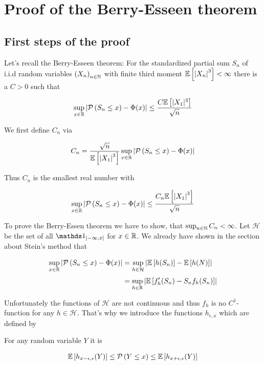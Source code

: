 \section{Proof of the Berry-Esseen theorem}

\subsection{First steps of the proof}

Let's recall the Berry-Esseen theorem: For the standardized partial sum $S_n$ of i.i.d random variables $\left({X_n}\right)_{{n}\in\mathbb N}$ with finite third moment $\mathbb E\left[{\left|{X_n}\right|^3}\right]<\infty$ there is a $C > 0$ such that

\begin{align}
  \sup_{x\in\mathbb R} \left|{\mathcal P\left({S_n\le x}\right)-\Phi(x)}\right| \le \frac{C \mathbb E\left[{|X_1|^3}\right]}{\sqrt n}
\end{align}

We first define $C_n$ via

\begin{align}
  C_n = \frac{\sqrt{n}}{\mathbb E\left[{\left|{X_1}\right|^3}\right]} \sup_{x\in\mathbb R} \left|{\mathcal P\left({S_n \le x}\right)-\Phi(x)}\right|
\end{align}

\noindent Thus $C_n$ is the smallest real number with

\begin{align}
  \sup_{x\in\mathbb R}\left|{\mathcal P\left({S_n\le x}\right) - \Phi(x)}\right| \le \frac{C_n\mathbb E\left[{\left|{X_1}\right|^3}\right]}{\sqrt{n}}
\end{align}

To prove the Berry-Essen theorem we have to show, that $\sup_{n\in\mathbb N} C_n < \infty$. Let $\mathcal H$ be the set of all $\cfs{x}$ for $x\in\mathbb R$. We already have shown in the section about Stein's method that

\begin{align}
  \sup_{x\in\R}\abs{\P{S_n\le x} - \Phi(x)} & = \sup_{h\in\mathcal H} \abs{\E{h(S_n)}-\E{h(N)}} \nl
  &= \sup_{h\in\R} \abs{\E{f_h'(S_n)-S_n f_h(S_n)}}
\end{align}

Unfortunately the functions of $\mathcal H$ are not continuous and thus $f_h$ is no $C^1$-function for any $h\in \mathcal H$. That's why we introduce the functions $h_{\epsilon,x}$ which are defined by


\noindent For any random variable $Y$ it is

\begin{align} \label{berryproof:inequality1}
  \mathbb E\left[{h_{x-\epsilon,\epsilon}(Y)}\right] \le \mathcal P\left({Y \le x}\right) \le \mathbb E\left[{h_{x+\epsilon,\epsilon}(Y)}\right]
\end{align}

